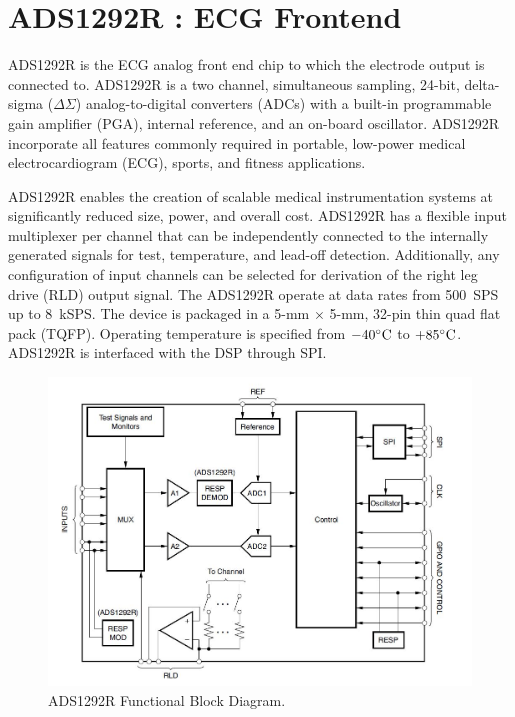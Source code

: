 \section{ADS1292R : ECG Frontend}

ADS1292R is the ECG analog front end chip to which the electrode
output is connected to. ADS1292R is a two channel, simultaneous
sampling, 24-bit, delta-sigma ($\Delta$$\Sigma$) analog-to-digital
converters (ADCs) with a built-in programmable gain amplifier (PGA),
internal reference, and an on-board oscillator. ADS1292R incorporate
all features commonly required in portable, low-power medical
electrocardiogram (ECG), sports, and fitness applications.
\begin{comment}
\begin{cmtPai}
	(2/17) uh... ``exceptional performance'' sounds too much like
	marketing speak.  Make sure you don't copy writeup directly from
any of the product literature.
\end{cmtPai}
\begin{cmtSMS}
	(2/18) okay professor, I will edit this section and tone down the prodct literature contents. Fixed.
\end{cmtSMS}
\end{comment}
ADS1292R enables the creation of scalable medical instrumentation
systems at significantly reduced size, power, and overall cost.
ADS1292R has a flexible input multiplexer per channel that can be
independently connected to the internally generated signals for test,
temperature, and lead-off detection. Additionally, any configuration
of input channels can be selected for derivation of the right leg
drive (RLD) output signal.  The ADS1292R operate at data rates from
500~SPS up to 8~kSPS. The device is packaged in a 5-mm $\times$ 5-mm,
32-pin thin quad flat pack (TQFP). Operating temperature is specified
from $-40^{\circ}\text{C}$ to $+85^{\circ}\text{C}$. ADS1292R is interfaced with the DSP
through SPI.

 \begin{figure}
 	\centering
 	\includegraphics[scale = 0.7 ]{ADS1292R}
\caption{ADS1292R Functional Block Diagram. \cite{ads}}
\label{ADS1292R}
 \end{figure}
 
